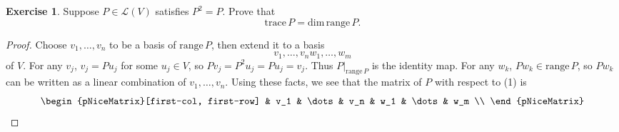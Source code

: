 \documentclass{article}
\theoremstyle{definition}
\newtheorem{ex}{Exercise}
\begin{document}
\begin{ex}
	Suppose $P \in \mathcal{L}(V)$ satisfies $P^2 = P$.
	Prove that \begin{equation*}
		\mathrm{trace}\,P = \mathrm{dim}\,\mathrm{range}\,P.
	\end{equation*}
\end{ex}
\begin{proof}
	Choose $v_1, \dots, v_n$ to be a basis of $\mathrm{range}\,P$, then extend it to a basis \begin{equation*}
		v_1, \dots, v_n w_1, \dots, w_m \tag{1}
	\end{equation*} of $V$.
	For any $v_j$, $v_j = Pu_j$ for some $u_j \in V$, so $Pv_j = P^2u_j = Pu_j = v_j$.
	Thus $P|_{\mathrm{range}\,P}$ is the identity map.
	For any $w_k$, $Pw_k \in \mathrm{range}\,P$, so $Pw_k$ can be written as a linear combination of $v_1, \dots, v_n$.
	Using these facts, we see that the matrix of $P$ with respect to (1) is
	\begin{equation*}
		\begin{pNiceMatrix}[first-col, first-row]
			                    & v_1              & \dots  & v_n & w_1 & \dots & w_m \\

\end{pNiceMatrix}
\end{equation*}
\end{proof}
\end{document}
